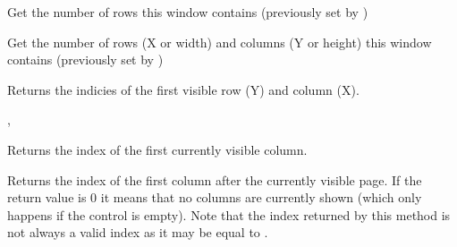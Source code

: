 \label{wxhvscrolledwindowgetrowcount}


Get the number of rows this window contains (previously set by 
)


\label{wxhvscrolledwindowgetrowcolumncounts}


Get the number of rows (X or width) and columns (Y or height) this window
contains (previously set
by )


\label{wxhvscrolledwindowgetvisiblebegin}


Returns the indicies of the first visible row (Y) and column (X).


, 


\label{wxhvscrolledwindowgetvisiblecolumnsbegin}


Returns the index of the first currently visible column.




\label{wxhvscrolledwindowgetvisiblecolumnsend}


Returns the index of the first column after the currently visible page. If the
return value is $0$ it means that no columns are currently shown (which only
happens if the control is empty). Note that the index returned by this method
is not always a valid index as it may be equal to 
.




